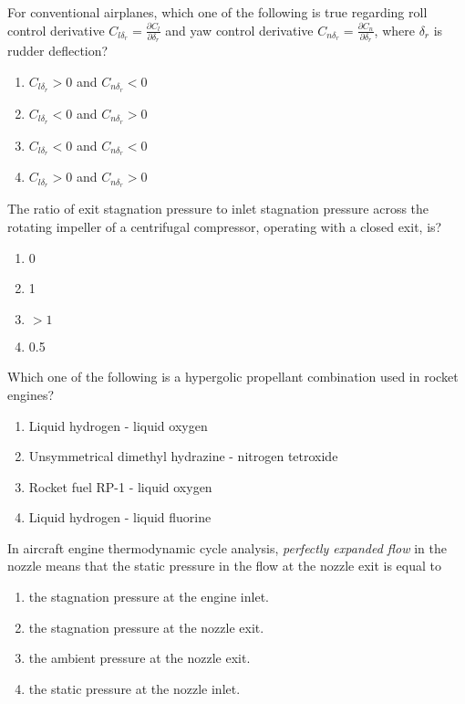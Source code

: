 	\item 
	For conventional airplanes, which one of the following is true regarding roll control derivative $C_{l\delta_{r}} = \frac{\partial C_{l}}{\partial \delta_{r}}$ and yaw control derivative $C_{n\delta_{r}} = \frac{\partial C_{n}}{\partial \delta_{r}}$, where $\delta_{r}$ is rudder deflection?
		\begin{enumerate}
			\item $C_{l\delta_{r}} > 0$ and $C_{n\delta_{r}} < 0$
			\item $C_{l\delta_{r}} < 0$ and $C_{n\delta_{r}} > 0$
			\item $C_{l\delta_{r}} < 0$ and $C_{n\delta_{r}} < 0$
			\item $C_{l\delta_{r}} > 0$ and $C_{n\delta_{r}} > 0$
		\end{enumerate}
	\item
	The ratio of exit stagnation pressure to inlet stagnation pressure across the rotating impeller of a centrifugal compressor, operating with a closed exit, is?
		\begin{enumerate}
			\item 0
			\item 1
			\item $> 1$
			\item 0.5
		\end{enumerate}
	\item
	Which one of the following is a hypergolic propellant combination used in rocket engines?
		\begin{enumerate}
			\item Liquid hydrogen - liquid oxygen
			\item Unsymmetrical dimethyl hydrazine - nitrogen tetroxide
			\item Rocket fuel RP-1 - liquid oxygen
			\item Liquid hydrogen - liquid fluorine
		\end{enumerate}
	\item
	In aircraft engine thermodynamic cycle analysis, \textit{perfectly expanded flow} in the nozzle means that the static pressure in the flow at the nozzle exit is equal to
		\begin{enumerate}
			\item the stagnation pressure at the engine inlet.
			\item the stagnation pressure at the nozzle exit.
			\item the ambient pressure at the nozzle exit.
			\item the static pressure at the nozzle inlet.
		\end{enumerate}
